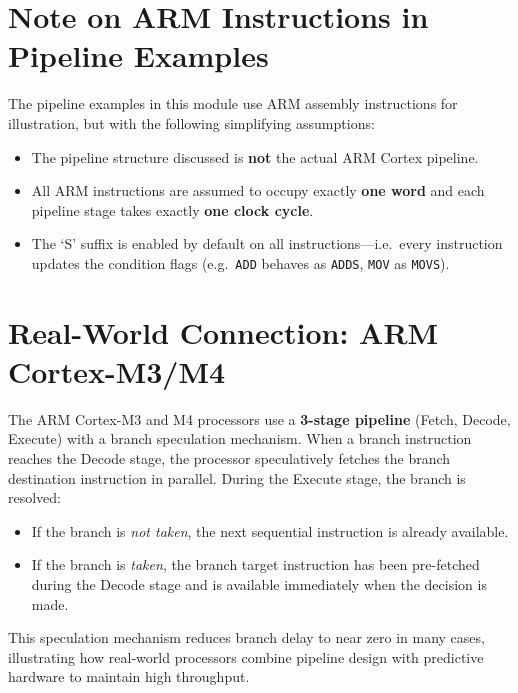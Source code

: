 \documentclass[11pt, a4paper, notitlepage]{report}
\theoremstyle{definition}
\theoremstyle{remark}
\theoremstyle{definition}
\begin{document}
\section{Note on ARM Instructions in Pipeline Examples}
\label{sec:arm-pipeline-note}

The pipeline examples in this module use ARM assembly instructions for illustration, but with the following simplifying assumptions:

\begin{itemize}
  \item The pipeline structure discussed is \textbf{not} the actual ARM Cortex pipeline.
  \item All ARM instructions are assumed to occupy exactly \textbf{one word} and each pipeline stage takes exactly \textbf{one clock cycle}.
  \item The `S' suffix is enabled by default on all instructions---i.e.\ every instruction updates the condition flags (e.g.\ \texttt{ADD} behaves as \texttt{ADDS}, \texttt{MOV} as \texttt{MOVS}).
\end{itemize}

\section{Real-World Connection: ARM Cortex-M3/M4}
\label{sec:arm-cortex}

The ARM Cortex-M3 and M4 processors use a \textbf{3-stage pipeline} (Fetch, Decode, Execute) with a branch speculation mechanism. When a branch instruction reaches the Decode stage, the processor speculatively fetches the branch destination instruction in parallel. During the Execute stage, the branch is resolved:

\begin{itemize}
  \item If the branch is \emph{not taken}, the next sequential instruction is already available.
  \item If the branch is \emph{taken}, the branch target instruction has been pre-fetched during the Decode stage and is available immediately when the decision is made.
\end{itemize}

This speculation mechanism reduces branch delay to near zero in many cases, illustrating how real-world processors combine pipeline design with predictive hardware to maintain high throughput.
\end{document}
